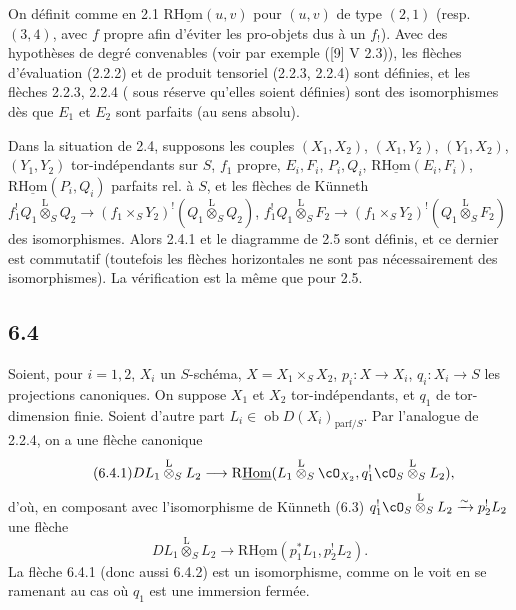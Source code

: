On définit comme en 2.1 $\mathrm{R}\underline{\mathrm{Hom}}(u,v)$ pour $(u,v)$ de type $(2,1)$ (resp. $(3,4)$, avec $f$ propre afin d'éviter les pro-objets dus à un $f_!$). Avec des hypothèses de degré convenables (voir par exemple ([9] V 2.3)), les flèches d'évaluation (2.2.2) et de produit tensoriel (2.2.3, 2.2.4) sont définies, et les flèches 
2.2.3, 2.2.4 (
sous réserve qu'elles soient définies) sont des isomorphismes dès que $E_1$ et $E_2$ sont parfaits (au sens absolu).

Dans la situation de 2.4, supposons les couples $(X_1,X_2)$, $(X_1,Y_2)$, $(Y_1,X_2)$, $(Y_1,Y_2)$ tor-indépendants sur $S$, $f_1$ propre, $E_i,F_i$, $P_i,Q_i$, $\mathrm{R}\underline{\mathrm{Hom}}(E_i,F_i)$, $\mathrm{R}\underline{\mathrm{Hom}}(P_i,Q_i)$ parfaits rel. à $S$, et les flèches de Künneth $f_1^!Q_1\overset{\mathrm{L}}{\otimes}_SQ_2\to(f_1\times_SY_2)^!(Q_1\overset{\mathrm{L}}{\otimes}_SQ_2)$, $f_1^!Q_1\overset{\mathrm{L}}{\otimes}_SF_2\to(f_1\times_SY_2)^!(Q_1\overset{\mathrm{L}}{\otimes}_SF_2)$ des isomorphismes. Alors 2.4.1 et le diagramme de 2.5 sont définis, et ce dernier est commutatif (toutefois les flèches horizontales ne sont pas nécessairement des isomorphismes). La vérification est la même que pour 2.5.

\subsection*{6.4}
Soient, pour $i=1,2$, $X_i$ un $S$-schéma, $X=X_1\times_SX_2$, $p_i:X\to X_i$, $q_i:X_i\to S$ les projections canoniques. On suppose $X_1$ et $X_2$ tor-indépendants, et $q_1$ de tor-dimension finie. Soient d'autre part $L_i\in\operatorname{ob}D(X_i)_{\mathrm{parf}/S}$. Par l'analogue de 2.2.4, on a une flèche canonique
\begin{equation}
\tag{6.4.1}
DL_1\overset{\mathrm{L}}{\otimes}_SL_2\longrightarrow \mathrm{R}\underline{\mathrm{Hom}}(L_1\overset{\mathrm{L}}{\otimes}_S\cO_{X_2},q_1^!\cO_S\overset{\mathrm{L}}{\otimes}_SL_2),
\end{equation}
d'où, en composant avec l'isomorphisme de Künneth (6.3) $q_1^!\cO_S\overset{\mathrm{L}}{\otimes}_SL_2\xrightarrow{\sim}p_2^!L_2$ une flèche
\begin{equation}
\tag{6.4.2}
DL_1\overset{\mathrm{L}}{\otimes}_SL_2\longrightarrow\mathrm{R}\underline{\mathrm{Hom}}(p_1^*L_1,p_2^!L_2).
\end{equation}
La flèche 6.4.1 (donc aussi 6.4.2) est un isomorphisme, comme on le voit en se ramenant au cas où $q_1$ est une immersion fermée.

